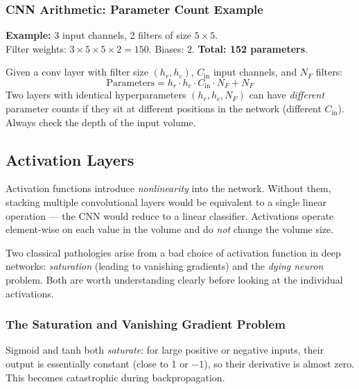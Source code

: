 \documentclass[11pt,a4paper]{article}
\begin{document}
\subsubsection{CNN Arithmetic: Parameter Count Example}

\begin{tcolorbox}[colback=NoteGrayBg,colframe=NoteGray,boxrule=0.8pt,arc=3pt]
\textbf{Example:} 3 input channels, 2 filters of size $5\times5$.\\
Filter weights: $3 \times 5 \times 5 \times 2 = 150$. Biases: $2$. \textbf{Total: 152 parameters}.
\end{tcolorbox}

\begin{insightbox}
Given a conv layer with filter size $(h_r, h_c)$, $C_\text{in}$ input channels, and $N_F$ filters:
\[
\text{Parameters} = h_r \cdot h_c \cdot C_\text{in} \cdot N_F + N_F
\]
Two layers with identical hyperparameters $(h_r, h_c, N_F)$ can have \emph{different} parameter counts if they sit at different positions in the network (different $C_\text{in}$). Always check the depth of the input volume.
\end{insightbox}

\subsection{Activation Layers}

Activation functions introduce \emph{nonlinearity} into the network. Without them, stacking multiple convolutional layers would be equivalent to a single linear operation — the CNN would reduce to a linear classifier. Activations operate element-wise on each value in the volume and do \emph{not} change the volume size.

Two classical pathologies arise from a bad choice of activation function in deep networks: \emph{saturation} (leading to vanishing gradients) and the \emph{dying neuron} problem. Both are worth understanding clearly before looking at the individual activations.

\subsubsection{The Saturation and Vanishing Gradient Problem}

Sigmoid and tanh both \emph{saturate}: for large positive or negative inputs, their output is essentially constant (close to 1 or $-1$), so their derivative is almost zero. This becomes catastrophic during backpropagation.
\end{document}

